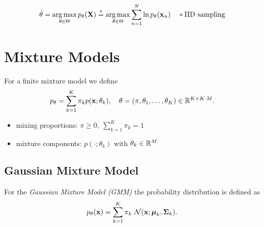 \begin{definition}
\[
\hat{\theta} = \operatorname*{arg\,max}_{\theta \in \Theta} p_\theta (\boldsymbol{\mathrm{X}}) \overset{\ast}{=} \operatorname*{arg\,max}_{\theta \in \Theta} \sum_{n=1}^N \ln p_\theta (\boldsymbol{\mathrm{x}}_n)
 \quad \ast \text{IID sampling}
\]
\end{definition}

\section{Mixture Models}
\begin{definition}
For a finite mixture model we define
\[
p_\theta = \sum_{k=1}^K \pi_k p(\boldsymbol{\mathrm{x}}; \theta_k),\quad \theta = (\pi, \theta_1, \ldots, \theta_K) \in \mathbb{R}^{K + K \cdot M}.
\]

\begin{itemize}
\item mixing proportions: \(\pi \geq 0,\ \sum_{k=1}^K \pi_k = 1\)
\item mixture components: \(p(\cdot;\theta_k)\) with \(\theta_k \in \mathbb{R}^M\)
\end{itemize}
\end{definition}

\subsection{Gaussian Mixture Model}
\begin{definition}
For the \textit{Gaussian Mixture Model (GMM)} the probability distribution is defined as
\[
p_\theta(\matr{x}) = \sum_{k=1}^K \pi_k \ \mathcal{N}(\matr{x}; \matr{\mu}_k, \matr{\Sigma}_k).
\]
\end{definition}

